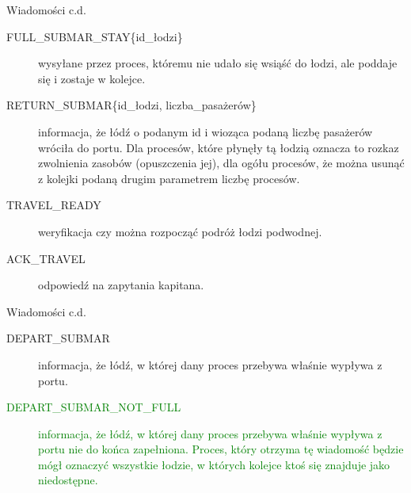 \documentclass{beamer}
\begin{document}
\begin{frame}{Wiadomości c.d.}
    \internallinenumbers
    \resetlinenumber[1]
    \begin{description}
        \item [FULL\_SUBMAR\_STAY\{id\_łodzi\}] wysyłane przez proces, któremu nie udało się wsiąść do łodzi, ale poddaje się i zostaje w kolejce.
        \item [RETURN\_SUBMAR\{id\_łodzi, liczba\_pasażerów\}] informacja, że łódź o podanym id i wioząca podaną liczbę pasażerów wróciła do portu. Dla procesów, które płynęły tą łodzią oznacza to rozkaz zwolnienia zasobów (opuszczenia jej), dla ogółu procesów, że można usunąć z kolejki podaną drugim parametrem liczbę procesów.
        \item [TRAVEL\_READY] weryfikacja czy można rozpocząć podróż łodzi podwodnej.
        \item [ACK\_TRAVEL] odpowiedź na zapytania kapitana.
    \end{description}
\end{frame}

\begin{frame}{Wiadomości c.d.}
    \internallinenumbers
    \resetlinenumber[1]
    \begin{description}
        \item [DEPART\_SUBMAR] informacja, że łódź, w której dany proces przebywa właśnie wypływa z portu.
        \item [\textcolor{green}{DEPART\_SUBMAR\_NOT\_FULL}] \textcolor{green}{informacja, że łódź, w której dany proces przebywa właśnie wypływa z portu nie do końca zapełniona. Proces, który otrzyma tę wiadomość będzie mógł oznaczyć wszystkie łodzie, w których kolejce ktoś się znajduje jako niedostępne.}
    \end{description}
\end{frame}
\end{document}
